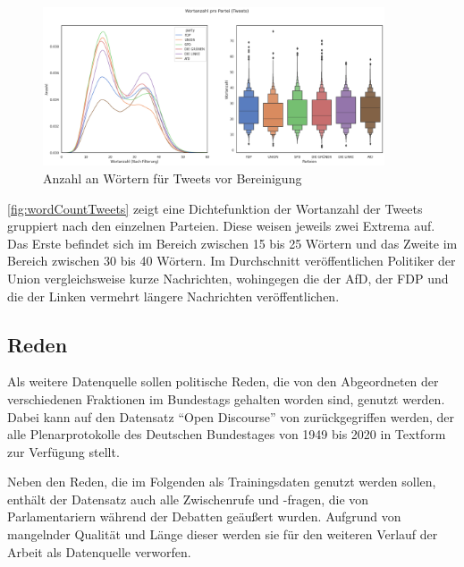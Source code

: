 
\begin{figure}[H]
    \centering
    \includegraphics[width=0.9\textwidth]{data/images/tweets_word_count.png}
    \caption{Anzahl an Wörtern für Tweets vor Bereinigung} \label{fig:wordCountTweets}
\end{figure}


\autoref{fig:wordCountTweets} zeigt eine Dichtefunktion der Wortanzahl der Tweets gruppiert nach den einzelnen Parteien. Diese weisen jeweils zwei Extrema auf. Das Erste befindet sich im Bereich zwischen \num{15} bis \num{25} Wörtern und das Zweite im Bereich zwischen \num{30} bis \num{40} Wörtern. Im Durchschnitt veröffentlichen Politiker der Union vergleichsweise kurze Nachrichten, wohingegen die der \ac{AfD}, der \ac{FDP} und die der Linken vermehrt längere Nachrichten veröffentlichen.

\subsection*{Reden} \label{subsec:dataUnderstandingReden}

Als weitere Datenquelle sollen politische Reden, die von den Abgeordneten der verschiedenen Fraktionen im Bundestags gehalten worden sind, genutzt werden. Dabei kann auf den Datensatz \enquote{Open Discourse} von \textcite{richter_open_2021} zurückgegriffen werden, der alle Plenarprotokolle des Deutschen Bundestages von \num{1949} bis \num{2020} in Textform zur Verfügung stellt.

Neben den Reden, die im Folgenden als Trainingsdaten genutzt werden sollen, enthält der Datensatz auch alle Zwischenrufe und -fragen, die von Parlamentariern während der Debatten geäußert wurden. Aufgrund von mangelnder Qualität und Länge dieser werden sie für den weiteren Verlauf der Arbeit als Datenquelle verworfen.

